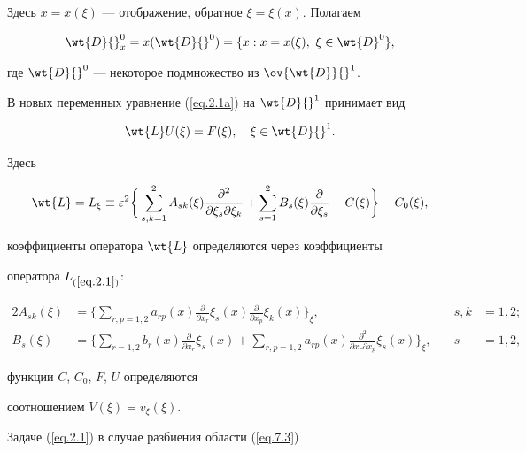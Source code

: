 Здесь $x=x(\xi)$ --- отображение, обратное $\xi=\xi(x)$. Полагаем


$$


\wt{D}{}^0_x=x(\wt{D}{}^0)=\{x: x=x(\xi),\ \xi\in\wt{D}^0 \},


$$


где $\wt{D}{}^0$ --- некоторое подмножество из $\ov{\wt{D}}{}^1$.





В новых переменных уравнение (\ref{eq.2.1a}) на $\wt{D}{}^1$ принимает вид


$$


\wt{L}U(\xi)=F(\xi),\quad \xi\in\wt{D}{}^1.


$$


Здесь


$$


\wt{L}=L_{\xi}\equiv \eps^2\bigg\{\sum_{s,k=1}^2 A_{sk}(\xi)


\frac{\pa^2}{\pa \xi_{ s}\pa \xi_{ k}}+\sum_{s=1}^2 B_s(\xi)


\frac{\pa}{\pa \xi_s}-C(\xi) \bigg\}-C_0(\xi),


$$


коэффициенты оператора $\wt{L}$ определяются через коэффициенты


оператора $L_{(\ref{eq.2.1})}$:


\begin{alignat*}{2}


A_{sk}(\xi)&=\bigg\{


\sum_{r,p=1,2} a_{rp}(x)\frac{\partial}{\partial x_r} \xi_{s}(x)


\frac{\partial}{\partial x_p} \xi_{k}(x)\bigg\}_{\xi}, &\quad s,k&=1,2;\\


B_{s}(\xi)&=\bigg\{


\sum_{r=1,2} b_{r}(x)\frac{\partial}{\partial x_r} \xi_{s}(x)+


\sum_{r,p=1,2} a_{rp}(x)\frac{\partial^2}{\partial x_r\partial x_p}


\xi_s(x)\bigg\}_{\xi}, &\quad s&=1,2,


\end{alignat*}


функции $C$, $C_0$, $F$, $U$ определяются


соотношением $V(\xi)=v_{\xi}(\xi)$.





Задаче (\ref{eq.2.1}) в случае разбиения области (\ref{eq.7.3})


